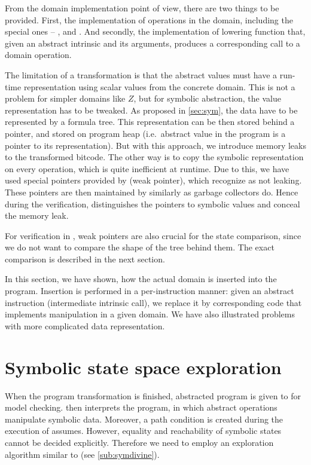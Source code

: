 From the domain implementation point of view, there are two things to be
provided. First, the implementation of operations in the domain, including
the special ones -- ,  and .
And secondly, the implementation of lowering function that, given an abstract
\LART intrinsic and its arguments, produces a corresponding call to a domain
operation.

The limitation of a transformation is that the abstract values must have a
run-time representation using scalar values from the concrete domain. This is
not a problem for simpler domains like $Z$, but for symbolic abstraction, the
value representation has to be tweaked. As proposed in \autoref{sec:sym}, the
data have to be represented by a formula tree. This representation can be
then stored behind a pointer, and stored on program heap (i.e.~abstract value in the program is a pointer to its representation). But with this approach, we
introduce memory leaks to the transformed bitcode. The other way is to copy the symbolic
representation on every operation, which is quite inefficient at runtime. Due to
this, we have used special pointers provided by \DIVINE (weak pointer), which
\DIVINE recognize as not leaking. These pointers are then maintained by \DIVM similarly as garbage collectors do. Hence during the verification, \DIVINE
distinguishes the pointers to symbolic values and conceal the memory leak.

For verification in \DIVINE, weak pointers are also crucial for the state
comparison, since we do not want to compare the shape of the tree behind them.
The exact comparison is described in the next section.

\begin{summary}
In this section, we have shown, how the actual domain is inserted into the
program. Insertion is performed in a per-instruction manner: given an abstract
instruction (intermediate intrinsic call), we replace it by corresponding code
that implements manipulation in a given domain. We have also illustrated
problems with more complicated data representation.
\end{summary}

\section{Symbolic state space exploration} \label{sec:symbolic}

When the program transformation is finished, abstracted program is given to
\DIVINE for model checking. \DIVINE then interprets the program, in which
abstract operations manipulate symbolic data. Moreover, a path condition is
created during the execution of assumes. However, equality and reachability of
symbolic states cannot be decided explicitly. Therefore we need to
employ an exploration algorithm similar to
\SymDIVINE (see \autoref{sub:symdivine}).

